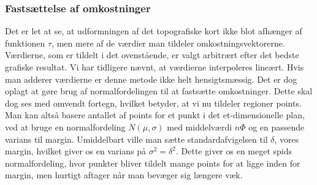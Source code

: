 {\subsubsection*{Fastsættelse af omkostninger}
Det er let at se, at udformningen af det topografiske kort ikke blot
afhænger af funktionen $\tau$, men mere af de værdier man tildeler
omkostningsvektorerne. Værdierne, som er tildelt i det ovenstående, er
valgt arbitrært efter det bedste grafiske resultat. Vi har tidligere
nævnt, at værdierne interpoleres lineært. Hvis man adderer værdierne er
denne metode ikke helt hensigtsmæssig. Det er dog oplagt at gøre brug af
normalfordelingen til at fastsætte omkostninger. Dette skal dog ses med
omvendt fortegn, hvilket betyder, at vi nu tildeler regioner points. Man
kan altså basere antallet af points for et punkt i det et-dimensionelle
plan, ved at bruge en normalfordeling $N(\mu, \sigma)$ med middelværdi
$n\varPhi$ og en passende varians til margin. Umiddelbart ville man
sætte standardafvigelsen til $\delta$, vores margin, hvilket giver os en
varians på $\sigma^{2} = \delta^{2}$. Dette giver os en meget spids
normalfordeling, hvor punkter bliver tildelt mange points for at ligge
inden for margin, men hurtigt aftager når man bevæger sig længere væk.


}

